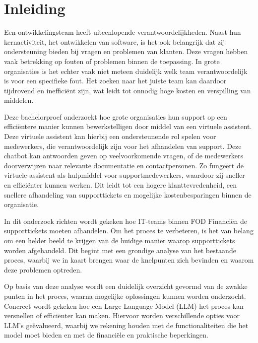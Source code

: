 
\section{Inleiding}%
\label{sec:inleiding}

Een ontwikkelingsteam heeft uiteenlopende verantwoordelijkheden. Naast hun kernactiviteit, het ontwikkelen van software, is het ook belangrijk dat zij ondersteuning bieden bij vragen en problemen van klanten. Deze vragen hebben vaak betrekking op fouten of problemen binnen de toepassing. In grote organisaties is het echter vaak niet meteen duidelijk welk team verantwoordelijk is voor een specifieke fout. Het zoeken naar het juiste team kan daardoor tijdrovend en inefficiënt zijn, wat leidt tot onnodig hoge kosten en verspilling van middelen.

Deze bachelorproef onderzoekt hoe grote organisaties hun support op een efficiëntere manier kunnen bewerkstelligen door middel van een virtuele assistent. Deze virtuele assistent kan hierbij een ondersteunende rol spelen voor medewerkers, die verantwoordelijk zijn voor het afhandelen van support. Deze chatbot kan antwoorden geven op veelvoorkomende vragen, of de medewerkers doorverwijzen naar relevante documentatie en contactpersonen. Zo fungeert de virtuele assistent als hulpmiddel voor supportmedewerkers, waardoor zij sneller en efficiënter kunnen werken. Dit leidt tot een hogere klanttevredenheid, een snellere afhandeling van supporttickets en mogelijke kostenbesparingen binnen de organisatie.

In dit onderzoek richten wordt gekeken hoe IT-teams binnen FOD Financiën de supporttickets moeten afhandelen. Om het proces te verbeteren, is het van belang om een helder beeld te krijgen van de huidige manier waarop supporttickets worden afgehandeld. Dit begint met een grondige analyse van het bestaande proces, waarbij we in kaart brengen waar de knelpunten zich bevinden en waarom deze problemen optreden.

Op basis van deze analyse wordt een duidelijk overzicht gevormd van de zwakke punten in het proces, waarna mogelijke oplossingen kunnen worden onderzocht. Concreet wordt gekeken hoe een Large Language Model (LLM) het proces kan versnellen of efficiënter kan maken. Hiervoor worden verschillende opties voor LLM’s geëvalueerd, waarbij we rekening houden met de functionaliteiten die het model moet bieden en met de financiële en praktische beperkingen.

